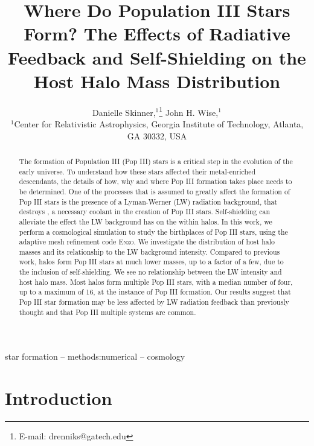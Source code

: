 \documentclass[a4paper,fleqn,usenatbib]{mnras}
\title[Where Do Pop III Stars Form?]{Where Do Population III Stars Form? The Effects of Radiative Feedback and Self-Shielding on the Host Halo Mass Distribution}
\author[Danielle Skinner et al.]{
Danielle Skinner,$^{1}$\thanks{E-mail: drenniks@gatech.edu}
John H. Wise,$^{1}$
\\
$^{1}$Center for Relativistic Astrophysics, Georgia Institute of Technology, 
Atlanta, GA 30332, USA\\
}
\begin{document}
\label{firstpage}
\pagerange{\pageref{firstpage}--\pageref{lastpage}}
\maketitle

\begin{abstract}
The formation of Population III (Pop III) stars is a critical step in the evolution of the early universe. To understand how these stars affected their metal-enriched descendants, the details of how, why and where Pop III formation takes place needs to be determined. One of the processes that is assumed to greatly affect the formation of Pop III stars is the presence of a Lyman-Werner (LW) radiation background, that destroys \hh{}, a necessary coolant in the creation of Pop III stars. Self-shielding can alleviate the effect the LW background has on the \hh{} within halos. In this work, we perform a cosmological simulation to study the birthplaces of Pop III stars, using the adaptive mesh refinement code \textsc{Enzo}. We investigate the distribution of host halo masses and its relationship to the LW background intensity. Compared to previous work, halos form Pop III stars at much lower masses, up to a factor of a few, due to the inclusion of \hh{} self-shielding. We see no relationship between the LW intensity and host halo mass. Most halos form multiple Pop III stars, with a median number of four, up to a maximum of 16, at the instance of Pop III formation. Our results suggest that Pop III star formation may be less affected by LW radiation feedback than previously thought and that Pop III multiple systems are common. 
\end{abstract}{}

\begin{keywords}
star formation -- methods:numerical -- cosmology
\end{keywords}


\section{Introduction}
\end{document}
